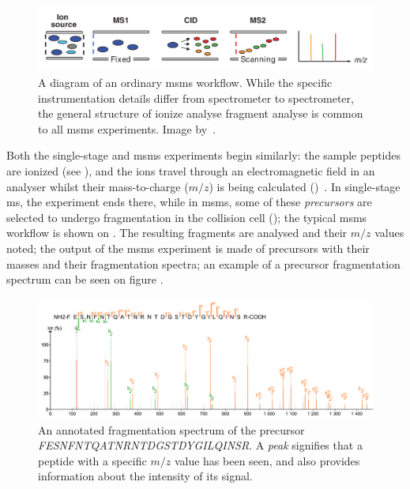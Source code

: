 \begin{figure}
  \centering
  \includegraphics[width=.9\linewidth]{img/msms-workflow.png}
  \caption{A diagram of an ordinary \gls*{msms} workflow. While the specific instrumentation details differ from spectrometer to spectrometer, the general structure of ionize \textrightarrow{} analyse \textrightarrow{} fragment \textrightarrow{} analyse is common to all \gls*{msms} experiments. Image by~\citet{domon2006mass}.}\label{fig:mass-spectrometry-workflow}
\end{figure}

Both the single-stage and \gls*{msms} experiments begin similarly: the sample peptides are ionized (see ), and the ions travel through an electromagnetic field in an analyser whilst their mass-to-charge (\(m/z\)) is being calculated ()~\cite{gross2006mass}. In single-stage \gls*{ms}, the experiment ends there, while in \gls*{msms}, some of these \emph{precursors} are selected to undergo fragmentation in the collision cell (); the typical \gls*{msms} workflow is shown on . The resulting fragments are analysed and their \(m/z\) values noted; the output of the \gls*{msms} experiment is made of precursors with their masses and their fragmentation spectra; an example of a precursor fragmentation spectrum can be seen on figure .

\begin{figure}
  \centering
  \includegraphics[width=1\linewidth]{img/fragmentation-spectrum.png}
  \caption{An annotated fragmentation spectrum of the precursor \emph{FESNFNTQATNRNTDGSTDYGILQINSR}. A \emph{peak} signifies that a peptide with a specific \(m/z\) value has been seen, and also provides information about the intensity of its signal.}\label{fig:frag-spectrum}
\end{figure}

